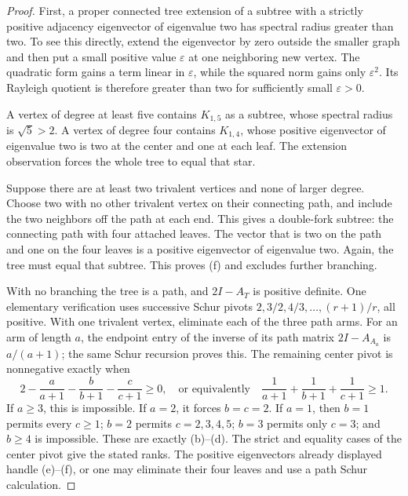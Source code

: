 \documentclass[11pt]{article}
\numberwithin{equation}{section}
\theoremstyle{definition}
\newcommand{\ep}{\varepsilon}
\begin{document}
\begin{proof}
First, a proper connected tree extension of a subtree with a strictly
positive adjacency eigenvector of eigenvalue two has spectral radius
greater than two.  To see this directly, extend the eigenvector by zero
outside the smaller graph and then put a small positive value $\ep$ at
one neighboring new vertex.  The quadratic form gains a term linear in
$\ep$, while the squared norm gains only $\ep^2$.  Its Rayleigh quotient
is therefore greater than two for sufficiently small $\ep>0$.

A vertex of degree at least five contains $K_{1,5}$ as a subtree, whose
spectral radius is $\sqrt5>2$.  A vertex of degree four contains
$K_{1,4}$, whose positive eigenvector of eigenvalue two is two at the
center and one at each leaf.  The extension observation forces the whole
tree to equal that star.

Suppose there are at least two trivalent vertices and none of larger
degree.  Choose two with no other trivalent vertex on their connecting
path, and include the two neighbors off the path at each end.  This gives
a double-fork subtree: the connecting path with four attached leaves.
The vector that is two on the path and one on the four leaves is a
positive eigenvector of eigenvalue two.  Again, the tree must equal that
subtree.  This proves (f) and excludes further branching.

With no branching the tree is a path, and $2I-A_T$ is positive definite.
One elementary verification uses successive Schur pivots
$2,3/2,4/3,\ldots,(r+1)/r$, all positive.
With one trivalent vertex, eliminate each of the three path arms.
For an arm of length $a$, the endpoint entry of the inverse of its
path matrix $2I-A_{A_a}$ is $a/(a+1)$; the same Schur recursion proves
this.  The remaining center pivot is nonnegative exactly when
\begin{equation}
 2-\frac a{a+1}-\frac b{b+1}-\frac c{c+1}\ge0,
 \quad\text{or equivalently}\quad
 \frac1{a+1}+\frac1{b+1}+\frac1{c+1}\ge1.
 \label{ade:eq:arms}
\end{equation}
If $a\ge3$, this is impossible.  If $a=2$, it forces $b=c=2$.
If $a=1$, then $b=1$ permits every $c\ge1$; $b=2$ permits
$c=2,3,4,5$; $b=3$ permits only $c=3$; and $b\ge4$ is impossible.
These are exactly (b)--(d).  The strict and equality cases of the center
pivot give the stated ranks.  The positive eigenvectors already displayed
handle (e)--(f), or one may eliminate their four leaves and use a path
Schur calculation.
\end{proof}
\end{document}
